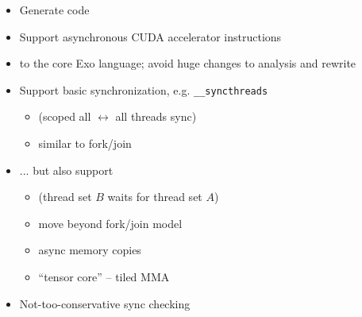 \begin{minipage}[t]{0.48\textwidth}\fixminipage
\vspace{-6mm}
\vspace{6mm}
\begin{itemize}
\item Generate  code
\item Support asynchronous CUDA accelerator instructions
\item {} to the core Exo language; avoid huge changes to analysis and rewrite
\item Support basic synchronization, e.g. \texttt{\_\_syncthreads}
\begin{itemize}
  \item (scoped all $\leftrightarrow$ all threads sync)
  \item similar to fork/join
\end{itemize}
\item ... but also support 
\begin{itemize}
  \item (thread set $B$ waits for thread set $A$)
  \item move beyond fork/join model
\end{itemize}
\begin{itemize}
  \item async memory copies
  \item ``tensor core'' -- tiled MMA
\end{itemize}
\item Not-too-conservative sync checking
\end{itemize}
\end{minipage} %
\hfill
